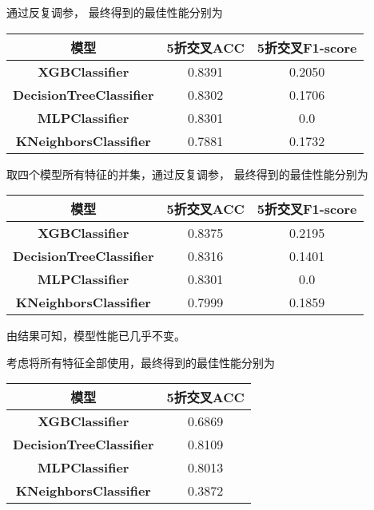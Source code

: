 \documentclass[12pt, a4paper, oneside]{ctexart}
\begin{document}
通过反复调参，
最终得到的最佳性能分别为

\begin{table*}[h]
    \centering%
    \begin{tabular}{ccc}%
    \toprule%
    模型&5折交叉ACC& 5折交叉F1-score\\
    \midrule%
    \textbf{XGBClassifier} &0.8391& 0.2050\\
    \textbf{DecisionTreeClassifier} &0.8302& 0.1706\\
    \textbf{MLPClassifier} &0.8301& 0.0\\
    \textbf{KNeighborsClassifier} & 0.7881&0.1732 \\

    \bottomrule%
    \end{tabular}
\end{table*}
\clearpage
取四个模型所有特征的并集，通过反复调参，
最终得到的最佳性能分别为

\begin{table*}[h]
    \centering%
    \begin{tabular}{ccc}%
    \toprule%
    模型&5折交叉ACC& 5折交叉F1-score\\
    \midrule%
    \textbf{XGBClassifier} &0.8375&0.2195 \\
    \textbf{DecisionTreeClassifier} &0.8316& 0.1401\\
    \textbf{MLPClassifier} &0.8301&0.0 \\
    \textbf{KNeighborsClassifier} & 0.7999&0.1859 \\

    \bottomrule%
    \end{tabular}
\end{table*}

由结果可知，模型性能已几乎不变。

考虑将所有特征全部使用，最终得到的最佳性能分别为

\begin{table*}[h]
    \centering%
    \begin{tabular}{cc}%
    \toprule%
    模型&5折交叉ACC\\
    \midrule%
    \textbf{XGBClassifier} &0.6869 \\
    \textbf{DecisionTreeClassifier} &0.8109 \\
    \textbf{MLPClassifier} &0.8013 \\
    \textbf{KNeighborsClassifier} & 0.3872 \\

    \bottomrule%
    \end{tabular}
\end{table*}
\end{document}
